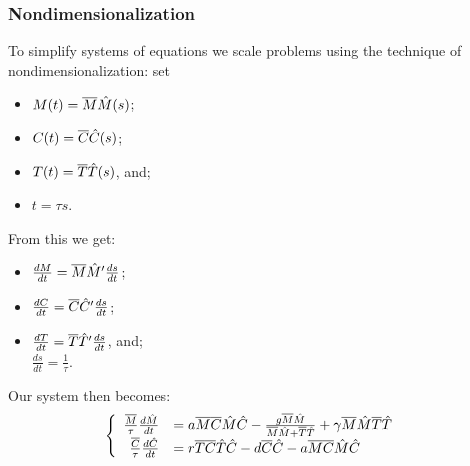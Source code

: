 \begin{frame}
  \frametitle{Nondimensionalization}
  To simplify systems of equations we scale problems using the technique of nondimensionalization: set {\begin{itemize}\itemsep0pt\item $M(t)=\overline{M}\HAT{M}(s)$;\\\item $C(t)=\overline{C}\HAT{C}(s)$;\\\item $T(t)=\overline{T}\HAT{T}(s)$, and;\\\item $t=\tau s$. \end{itemize} From this we get: \begin{itemize}\itemsep0pt \item$\frac{dM}{dt}=\overline{M}\HAT{M}'\frac{ds}{dt}$;\\\item $\frac{dC}{dt}=\overline{C}\HAT{C}'\frac{ds}{dt}$;\\\item $\frac{dT}{dt}=\overline{T}\HAT{T}'\frac{ds}{dt}$, and;\\ $\frac{ds}{dt}=\frac{1}{\tau}.$\end{itemize} }Our system then becomes: $$\begin{cases} 
\begin{array}{rl}
\frac{\overline{M}}{\tau}\frac{d\HAT{M}}{dt}&= a\overline{M}\overline{C}\HAT{M}\HAT{C}-\frac{g\overline{M}\HAT{M}}{\overline{M}\HAT{M}+\overline{T}\HAT{T}} + \gamma \overline{M}\HAT{M}\overline{T}\HAT{T}\\ 
\frac{\overline{C}}{\tau}\frac{d\HAT{C}}{dt}&=r\overline{T}\overline{C}\HAT{T}\HAT{C}-d\overline{C}\HAT{C}-a\overline{M}\overline{C}\HAT{M}\HAT{C}
\end{array} \end{cases}$$
\end{frame}
